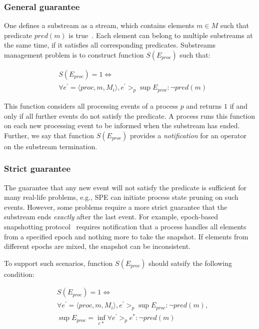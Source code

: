 \subsubsection{General guarantee}

One defines a substream as a stream, which contains elements $m \in M$ such that predicate $pred(m)$ is true~\cite{Tucker:2003:EPS:776752.776780}. Each element can belong to multiple substreams at the same time, if it satisfies all corresponding predicates. Substreams management problem is to construct function $S(E_{proc})$ such that:

\begin{align*}
& S(E_{proc}) = 1 \Longleftrightarrow \\ 
& \forall e^{'} = \langle proc,m,M_i\rangle, e^{'} >_p \sup E_{proc} : \neg pred(m)
\end{align*}

This function considers all processing events of a process $p$ and returns $1$ if and only if all further events do not satisfy the predicate. A process runs this function on each new processing event to be informed when the substream has ended. Further, we say that function $S(E_{proc})$ provides a {\em notification} for an operator on the substream termination.

\subsubsection{Strict guarantee}

The guarantee that any new event will not satisfy the predicate is sufficient for many real-life problems, e.g., SPE can initiate process state pruning on such events. However, some problems require a more strict guarantee that the substream ends {\em exactly} after the last event. For example, epoch-based snapshotting protocol~\cite{2015arXiv150608603C, jacques2016consistent} requires notification that a process handles all elements from a specified epoch and nothing more to take the snapshot. If elements from different epochs are mixed, the snapshot can be inconsistent.

To support such scenarios, function $S(E_{proc})$ should satsify the following condition:

\begin{align*}
& S(E_{proc}) = 1  \Longleftrightarrow \\
& \forall e^{'} = \langle proc,m,M_i\rangle, e^{'} >_p \sup E_{proc} : \neg pred(m), \\
& \sup E_{proc} = \inf_{e*} \forall e^{'} >_p e^{*} : \neg pred(m) 
\end{align*}

